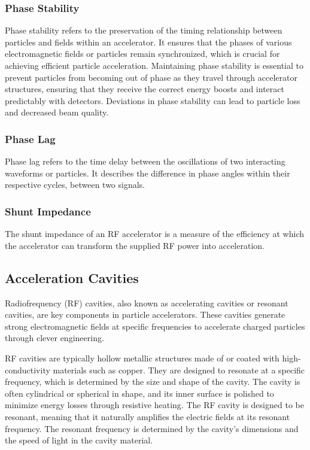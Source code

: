 \documentclass[a4paper,oneside,12pt]{report}
\numberwithin{equation}{chapter}
\begin{document}
\subsubsection{Phase Stability}
Phase stability refers to the preservation of the timing relationship between particles and fields within an accelerator. 
It ensures that the phases of various electromagnetic fields or particles remain synchronized, 
which is crucial for achieving efficient particle acceleration. 
Maintaining phase stability is essential to prevent particles from becoming out of phase as they travel through accelerator structures, 
ensuring that they receive the correct energy boosts and interact predictably with detectors. 
Deviations in phase stability can lead to particle loss and decreased beam quality.

\subsubsection{Phase Lag}
Phase lag refers to the time delay between the oscillations of two interacting waveforms or particles. 
It describes the difference in phase angles within their respective cycles, between two signals. 

\subsubsection{Shunt Impedance}
The shunt impedance of an RF accelerator is a measure of the efficiency 
at which the accelerator can transform the supplied RF power into acceleration.


\subsection{Acceleration Cavities} \label{sec:theory_cavities}
Radiofrequency (RF) cavities, also known as accelerating cavities or resonant cavities, are key components in particle accelerators. 
These cavities generate strong electromagnetic fields at specific frequencies to accelerate charged particles through clever engineering.

RF cavities are typically hollow metallic structures made of or coated with high-conductivity materials such as copper. 
They are designed to resonate at a specific frequency, which is determined by the size and shape of the cavity. 
The cavity is often cylindrical or spherical in shape, and its inner surface is polished to minimize energy losses through resistive heating.
The RF cavity is designed to be resonant, meaning that it naturally amplifies the electric fields at its resonant frequency. 
The resonant frequency is determined by the cavity's dimensions and the speed of light in the cavity material.
\end{document}
